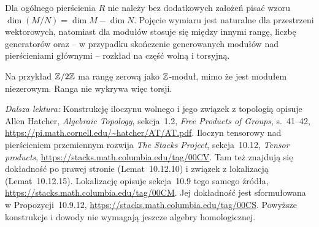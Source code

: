 \begin{uwaga}
Dla ogólnego pierścienia $R$ nie należy bez dodatkowych założeń
pisać wzoru $\dim(M/N)=\dim M-\dim N$.
Pojęcie wymiaru jest naturalne dla przestrzeni wektorowych, natomiast
dla modułów stosuje się między innymi rangę, liczbę generatorów
oraz -- w przypadku skończenie generowanych modułów nad
pierścieniami głównymi -- rozkład
na część wolną i torsyjną.

Na przykład $\mathbb{Z}/2\mathbb{Z}$ ma rangę zerową jako $\mathbb{Z}$-moduł,
mimo że jest modułem niezerowym. Ranga nie wykrywa więc torsji.
\end{uwaga}

\par\smallskip
{\footnotesize\noindent\emph{Dalsza lektura:}
Konstrukcję iloczynu wolnego i jego związek z topologią opisuje
Allen Hatcher, \emph{Algebraic Topology}, sekcja~1.2,
\emph{Free Products of Groups}, s.~41--42,
\url{https://pi.math.cornell.edu/~hatcher/AT/AT.pdf}.
Iloczyn tensorowy nad pierścieniem przemiennym rozwija
\emph{The Stacks Project}, sekcja~10.12, \emph{Tensor products},
\url{https://stacks.math.columbia.edu/tag/00CV}.
Tam też znajdują się dokładność po prawej stronie
(Lemat~10.12.10) i związek z lokalizacją (Lemat~10.12.15).
Lokalizację opisuje sekcja~10.9 tego samego źródła,
\url{https://stacks.math.columbia.edu/tag/00CM}.
Jej dokładność jest sformułowana w Propozycji~10.9.12,
\url{https://stacks.math.columbia.edu/tag/00CS}.
Powyższe konstrukcje i dowody nie wymagają jeszcze algebry homologicznej.\par}
